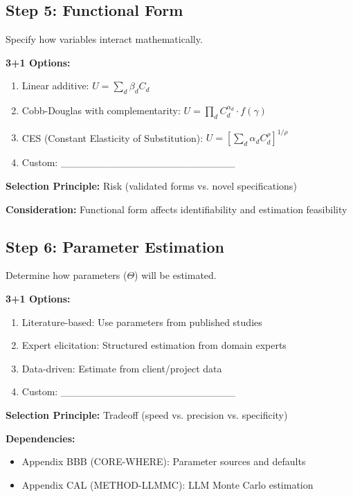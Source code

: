 \subsection{Step 5: Functional Form}

Specify how variables interact mathematically.

\begin{tcolorbox}[colback=white, colframe=black,
    title=Step 5: Functional Form]
\textbf{3+1 Options:}
\begin{enumerate}
\item[$\square$] Linear additive: $U = \sum_d \beta_d C_d$
\item[$\square$] Cobb-Douglas with complementarity: $U = \prod_d C_d^{\alpha_d} \cdot f(\gamma)$
\item[$\square$] CES (Constant Elasticity of Substitution): $U = \left[\sum_d \alpha_d C_d^\rho\right]^{1/\rho}$
\item[$\square$] Custom: \_\_\_\_\_\_\_\_\_\_\_\_\_\_\_\_\_\_\_\_\_\_\_\_
\end{enumerate}

\textbf{Selection Principle:} Risk (validated forms vs. novel specifications)

\textbf{Consideration:} Functional form affects identifiability and estimation feasibility
\end{tcolorbox}

\subsection{Step 6: Parameter Estimation}

Determine how parameters ($\Theta$) will be estimated.

\begin{tcolorbox}[colback=white, colframe=black,
    title=Step 6: Parameter Estimation]
\textbf{3+1 Options:}
\begin{enumerate}
\item[$\square$] Literature-based: Use parameters from published studies
\item[$\square$] Expert elicitation: Structured estimation from domain experts
\item[$\square$] Data-driven: Estimate from client/project data
\item[$\square$] Custom: \_\_\_\_\_\_\_\_\_\_\_\_\_\_\_\_\_\_\_\_\_\_\_\_
\end{enumerate}

\textbf{Selection Principle:} Tradeoff (speed vs. precision vs. specificity)

\textbf{Dependencies:}
\begin{itemize}[nosep]
\item Appendix BBB (CORE-WHERE): Parameter sources and defaults
\item Appendix CAL (METHOD-LLMMC): LLM Monte Carlo estimation
\end{itemize}
\end{tcolorbox}


